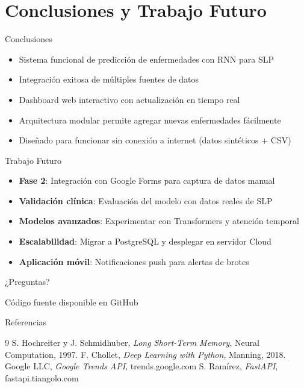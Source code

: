 \documentclass[10pt]{beamer}
\begin{document}
\section{Conclusiones y Trabajo Futuro}

\begin{frame}{Conclusiones}
  \begin{itemize}
    \item Sistema funcional de predicción de enfermedades con RNN para SLP
    \item Integración exitosa de múltiples fuentes de datos
    \item Dashboard web interactivo con actualización en tiempo real
    \item Arquitectura modular permite agregar nuevas enfermedades fácilmente
    \item Diseñado para funcionar sin conexión a internet (datos sintéticos + CSV)
  \end{itemize}
\end{frame}

\begin{frame}{Trabajo Futuro}
  \begin{itemize}
    \item \textbf{Fase 2}: Integración con Google Forms para captura de datos manual
    \item \textbf{Validación clínica}: Evaluación del modelo con datos reales de SLP
    \item \textbf{Modelos avanzados}: Experimentar con Transformers y atención temporal
    \item \textbf{Escalabilidad}: Migrar a PostgreSQL y desplegar en servidor Cloud
    \item \textbf{Aplicación móvil}: Notificaciones push para alertas de brotes
  \end{itemize}
\end{frame}

\begin{frame}[standout]
  \Huge ¿Preguntas?
  
  \vspace{1cm}
  \large Código fuente disponible en GitHub
\end{frame}

\begin{frame}[allowframebreaks]{Referencias}
  \begin{thebibliography}{9}
      S. Hochreiter y J. Schmidhuber,
      \textit{Long Short-Term Memory},
      Neural Computation, 1997.
      F. Chollet,
      \textit{Deep Learning with Python},
      Manning, 2018.
      Google LLC,
      \textit{Google Trends API},
      trends.google.com
      S. Ramírez,
      \textit{FastAPI},
      fastapi.tiangolo.com
  \end{thebibliography}
\end{frame}
\end{document}
